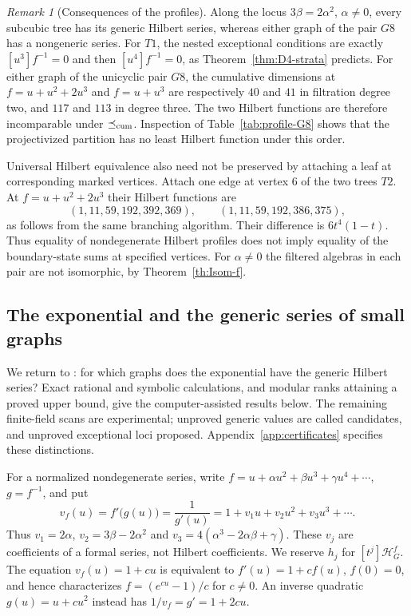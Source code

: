 \documentclass[reqno]{article}
\theoremstyle{plain} %
\theoremstyle{definition}
\theoremstyle{remark}
\newtheorem{remark}[theorem]{\sc Remark}
\newcommand{\hs}{\mathscr{H}}
\numberwithin{equation}{section}
\begin{document}
\begin{remark}[Consequences of the profiles]\label{rem:profile-consequences}
Along the locus $3\beta=2\alpha^2$, $\alpha\ne0$, every subcubic tree
has its generic Hilbert series, whereas either graph of the pair $G8$
has a nongeneric series.
For $T1$, the nested exceptional conditions are exactly
$[u^3]f^{-1}=0$ and then $[u^4]f^{-1}=0$, as
Theorem~\ref{thm:D4-strata} predicts.
For either graph of the unicyclic pair $G8$, the cumulative dimensions
at $f=u+u^2+2u^3$ and $f=u+u^3$ are respectively $40$ and $41$ in
filtration degree two, and $117$ and $113$ in degree three. The two
Hilbert functions are therefore incomparable under $\preceq_{\rm cum}$.
Inspection of Table~\ref{tab:profile-G8} shows that the projectivized
partition has no least Hilbert function under this order.

Universal Hilbert equivalence also need not be preserved by attaching
a leaf at corresponding marked vertices. Attach one edge at vertex $6$
of the two trees $T2$. At $f=u+u^2+2u^3$ their Hilbert functions are
\[
(1,11,59,192,392,369),\qquad(1,11,59,192,386,375),
\]
as follows from the same branching algorithm. Their difference is
$6t^4(1-t)$. Thus equality of nondegenerate Hilbert profiles does not
imply equality of the boundary-state sums at specified vertices.
For $\alpha\ne0$ the filtered algebras in each pair are not isomorphic,
by Theorem~\ref{th:Isom-f}.
\end{remark}


\subsection{The exponential and the generic series of small graphs}
\label{sec:exp-small}

We return to \cite[Problem~3]{NSh}: for which graphs does the exponential
have the generic Hilbert series? Exact rational and symbolic calculations,
and modular ranks attaining a proved upper bound, give the
computer-assisted results below. The remaining finite-field scans are
experimental; unproved generic values are called candidates, and unproved exceptional loci  proposed.
Appendix~\ref{app:certificates} specifies these distinctions.

For a normalized nondegenerate series, write
$f=u+\alpha u^2+\beta u^3+\gamma u^4+\cdots$, $g=f^{-1}$, and put
\begin{equation}\label{eq:velocity-series}
 v_f(u)=f'\bigl(g(u)\bigr)=\frac1{g'(u)}
       =1+v_1u+v_2u^2+v_3u^3+\cdots.
\end{equation}
Thus $v_1=2\alpha$, $v_2=3\beta-2\alpha^2$ and
$v_3=4(\alpha^3-2\alpha\beta+\gamma)$. These $v_j$ are coefficients
of a formal series, not Hilbert coefficients. We reserve $h_j$ for
$[t^j]\hs_G^f$. The equation $v_f(u)=1+cu$ is equivalent to
$f'(u)=1+cf(u)$, $f(0)=0$, and hence characterizes
$f=(e^{cu}-1)/c$ for $c\ne0$. An inverse quadratic
$g(u)=u+cu^2$ instead has $1/v_f=g'=1+2cu$.
\end{document}
